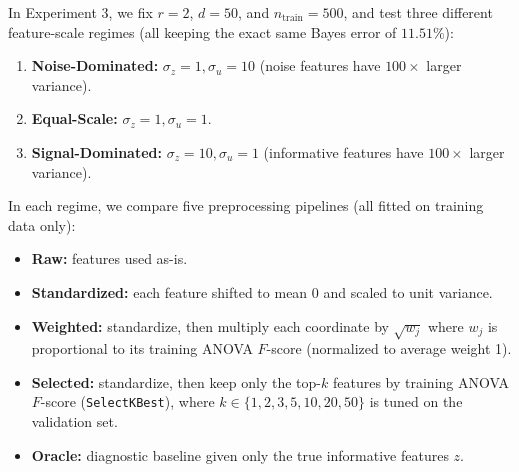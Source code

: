 \documentclass[11pt, a4paper]{article}
\begin{document}
In Experiment 3, we fix $r = 2$, $d = 50$, and $n_{\text{train}} = 500$, and test three different feature-scale regimes (all keeping the exact same Bayes error of $11.51\%$):
\begin{enumerate}
    \item \textbf{Noise-Dominated:} $\sigma_z = 1, \sigma_u = 10$ (noise features have $100\times$ larger variance).
    \item \textbf{Equal-Scale:} $\sigma_z = 1, \sigma_u = 1$.
    \item \textbf{Signal-Dominated:} $\sigma_z = 10, \sigma_u = 1$ (informative features have $100\times$ larger variance).
\end{enumerate}

In each regime, we compare five preprocessing pipelines (all fitted on training data only):
\begin{itemize}
    \item \textbf{Raw:} features used as-is.
    \item \textbf{Standardized:} each feature shifted to mean 0 and scaled to unit variance.
    \item \textbf{Weighted:} standardize, then multiply each coordinate by $\sqrt{w_j}$ where $w_j$ is proportional to its training ANOVA $F$-score (normalized to average weight 1).
    \item \textbf{Selected:} standardize, then keep only the top-$k$ features by training ANOVA $F$-score (\texttt{SelectKBest}), where $k \in \{1, 2, 3, 5, 10, 20, 50\}$ is tuned on the validation set.
    \item \textbf{Oracle:} diagnostic baseline given only the true informative features $z$.
\end{itemize}
\end{document}
